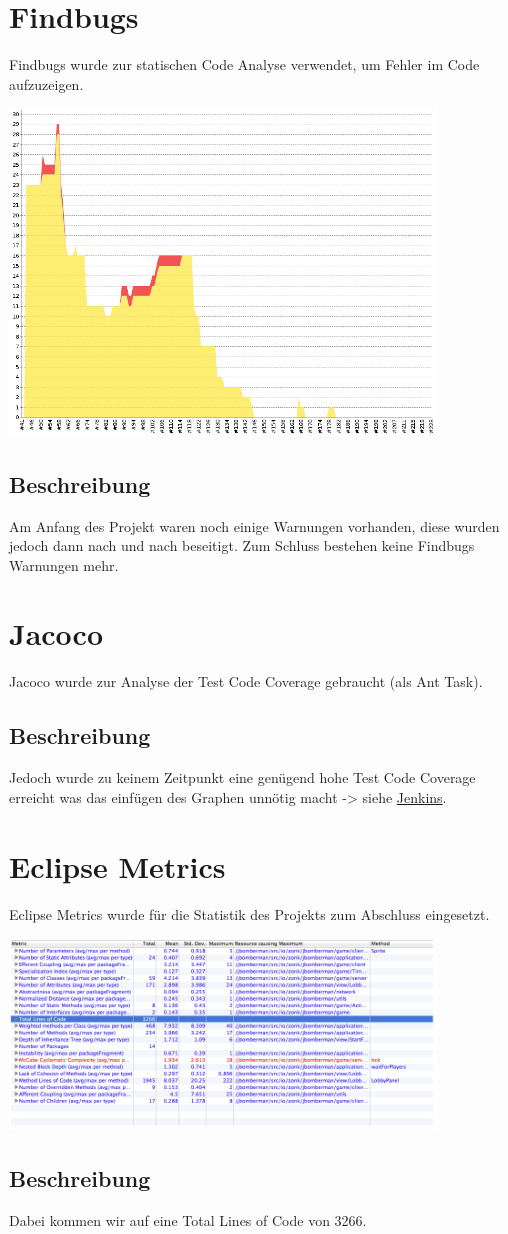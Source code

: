 \documentclass[11pt]{scrartcl}
\begin{document}
\section{Findbugs}
Findbugs wurde zur statischen Code Analyse verwendet, um Fehler im Code 
aufzuzeigen.
\begin{center}
 \includegraphics[width=0.85\textwidth]{findbugs}
\end{center}
\subsection{Beschreibung}
Am Anfang des Projekt waren noch einige Warnungen vorhanden, 
diese wurden jedoch dann nach und nach beseitigt.
Zum Schluss bestehen keine Findbugs Warnungen mehr.
\newpage
\section{Jacoco}
Jacoco wurde zur Analyse der Test Code Coverage gebraucht (als Ant Task).
\subsection{Beschreibung}
Jedoch wurde zu keinem Zeitpunkt eine genügend hohe Test Code Coverage 
erreicht was das einfügen des Graphen unnötig macht -> siehe 
\href{http://se2p.zonk.io/jenkins/}{Jenkins}.
\newpage
\section{Eclipse Metrics}
Eclipse Metrics wurde für die Statistik des Projekts zum Abschluss eingesetzt.
\begin{center}
 \includegraphics[width=0.85\textwidth]{metrics}
\end{center}
\subsection{Beschreibung}
Dabei kommen wir auf eine Total Lines of Code von 3266.
\end{document}
